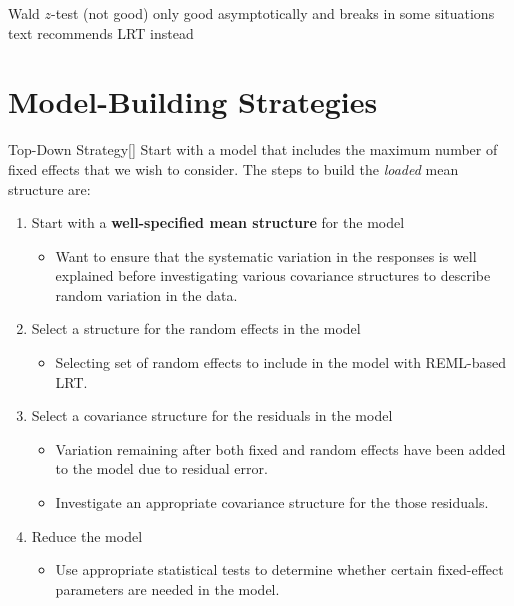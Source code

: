 \documentclass[english]{article}
\begin{document}
\begin{multicols*}{2}
Wald $z$-test (not good)
	only good asymptotically and breaks in some situations
	text recommends LRT instead	
	
	
\section{Model-Building Strategies}
\begin{definitionGENERAL}{Top-Down Strategy}[]
Start with a model that includes the maximum number of fixed effects that we wish to consider. The steps to build the \textit{loaded} mean structure are:

\begin{enumerate}
	\item	Start with a \textbf{well-specified mean structure} for the model
		\begin{itemize}
		\item	Want to ensure that the systematic variation in the responses is well explained before investigating various covariance structures to describe random variation in the data.
		\end{itemize}
	\item	Select a structure for the random effects in the model
		\begin{itemize}
		\item	Selecting set of random effects to include in the model with REML-based LRT.
		\end{itemize}
	\item	Select a covariance structure for the residuals in the model
		\begin{itemize}
		\item	Variation remaining after both fixed and random effects have been added to the model due to residual error.
		\item	Investigate an appropriate covariance structure for the those residuals.
		\end{itemize}
	\item	Reduce the model
		\begin{itemize}
		\item	Use appropriate statistical tests to determine whether certain fixed-effect parameters are needed in the model.
		\end{itemize}
\end{enumerate}
\end{definitionGENERAL}



\end{multicols*}
\end{document}
